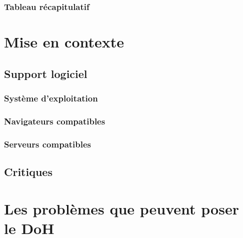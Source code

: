 \documentclass[a4paper,12pt]{article}
\begin{document}
	\subsubsection{Tableau récapitulatif}
	
	\section{Mise en contexte}
	
	\subsection{Support logiciel}
	
	\subsubsection{Système d'exploitation}
	
	\subsubsection{Navigateurs compatibles}
	
	\subsubsection{Serveurs compatibles}
	
	\subsection{Critiques}
	
	\section{Les problèmes que peuvent poser le DoH}
	
	
	
\end{document}
